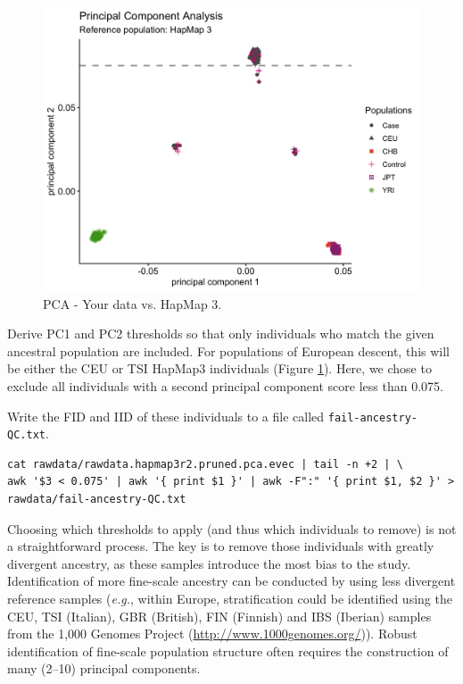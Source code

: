 \documentclass[
]{book}
\newcommand{\passthrough}[1]{#1}
\begin{document}
\begin{figure}

{\centering \includegraphics[width=18.67in]{img/_gwas/pca-hapmap3} 

}

\caption{PCA - Your data vs. HapMap 3.}\label{fig:show-pca-hapmap3}
\end{figure}

Derive PC1 and PC2 thresholds so that only individuals who match the given ancestral population are included. For populations of European descent, this will be either the CEU or TSI HapMap3 individuals (Figure \ref{fig:show-pca-hapmap3}). Here, we chose to exclude all individuals with a second principal component score less than 0.075.

Write the FID and IID of these individuals to a file called \passthrough{\lstinline!fail-ancestry-QC.txt!}.

\begin{lstlisting}
cat rawdata/rawdata.hapmap3r2.pruned.pca.evec | tail -n +2 | \
awk '$3 < 0.075' | awk '{ print $1 }' | awk -F":" '{ print $1, $2 }' > rawdata/fail-ancestry-QC.txt
\end{lstlisting}

Choosing which thresholds to apply (and thus which individuals to remove) is not a straightforward process. The key is to remove those individuals with greatly divergent ancestry, as these samples introduce the most bias to the study. Identification of more fine-scale ancestry can be conducted by using less divergent reference samples (\emph{e.g.}, within Europe, stratification could be identified using the CEU, TSI (Italian), GBR (British), FIN (Finnish) and IBS (Iberian) samples from the 1,000 Genomes Project (\url{http://www.1000genomes.org/})). Robust identification of fine-scale population structure often requires the construction of many (2--10) principal components.
\end{document}
